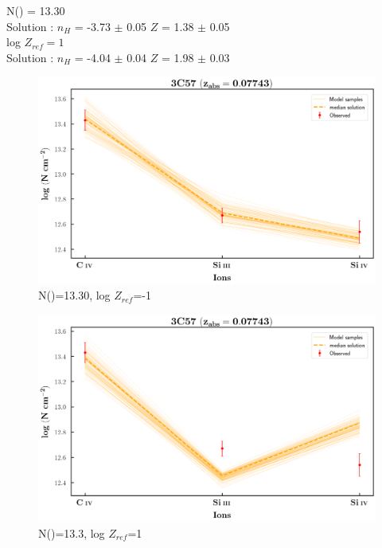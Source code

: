 \documentclass[12pt,draft]{report}
\newcommand\ion[2]{\text{#1\,\textsc{\lowercase{#2}}}}
\begin{document}
N(\ion{H}{I}) = 13.30   \\ 

Solution : $n_H$ = -3.73 $\pm$ 0.05 \hspace{10mm} $Z$ = 1.38 $\pm$ 0.05 \\

log $Z_{ref}=1$ \\

Solution : $n_H$ = -4.04 $\pm$ 0.04 \hspace{10mm} $Z$ = 1.98 $\pm$ 0.03 \newline  

\newpage

\begin{figure}[!t]
    \centering
    \includegraphics[width=0.9\linewidth]{Ionisation-Modelling-Plots/3c57-z=0.07743-compI_logZ=-1.png}
    \caption{N(\ion{H}{i})=13.30, log $Z_{ref}$=-1}
\end{figure}

\begin{figure}[!b]
    \centering
    \includegraphics[width=0.9\linewidth]{Ionisation-Modelling-Plots/3c57-z=0.07743-compI_logZ=1.png}
    \caption{N(\ion{H}{i})=13.3, log $Z_{ref}$=1}
\end{figure}
\end{document}
